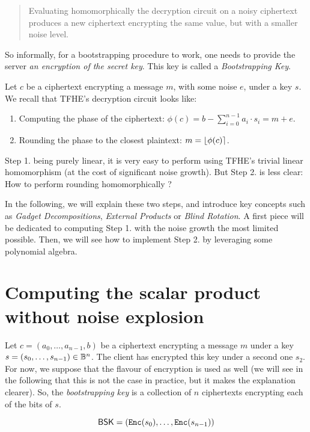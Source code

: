 \begin{quote}
	Evaluating homomorphically the decryption circuit on a noisy ciphertext produces a new ciphertext encrypting the same value, but with a smaller noise level.
\end{quote}

So informally, for a bootstrapping procedure to work, one needs to provide the server \textit{an encryption of the secret key}. This key is called a \textit{Bootstrapping Key}.



Let $c$ be a ciphertext encrypting a message $m$, with some noise $e$, under a key $s$. We recall that TFHE's decryption circuit looks like:

\begin{enumerate}
	\item Computing the phase of the ciphertext: $\phi(c) = b - \sum_{i=0}^{n-1} a_i \cdot s_i = m + e$.
	\item Rounding the phase to the closest plaintext: $m = \left \lfloor \phi(c) \right \rceil$.
\end{enumerate}


Step 1. being purely linear, it is very easy to perform using TFHE's trivial linear homomorphism (at the cost of significant noise growth). But Step 2. is less clear: How to perform rounding homomorphically ? 

In the following, we will explain these two steps, and introduce key concepts such as \textit{Gadget Decompositions}, \textit{External Products} or \textit{Blind Rotation}. A first piece will be dedicated to computing Step 1. with the noise growth the most limited possible. Then, we will see how to implement Step 2. by leveraging some polynomial algebra.

\section{Computing the scalar product without noise explosion}

Let $c = (a_0, \dots, a_{n-1}, b)$ be a \LWE ciphertext encrypting a message $m$ under a key $s = (s_0, \dots, s_{n-1}) \in \mathbb{B}^n$. The client has encrypted this key under a second one $s_2$. For now, we suppose that the \LWE flavour of encryption is used as well (we will see in the following that this is not the case in practice, but it makes the explanation clearer). So, the \textit{bootstrapping key} is a collection of $n$ ciphertexts encrypting each of the bits of $s$.

\begin{equation}
	\textsf{BSK} = \left ( \texttt{Enc}(s_0), \dots, \texttt{Enc}(s_{n-1}) \right )
\end{equation}



